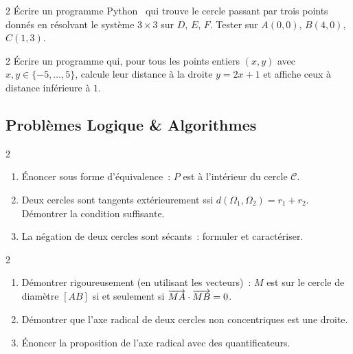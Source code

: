 \begin{bilan}
\begin{exo}{2}
\'Ecrire un programme Python \computer\ qui trouve le cercle passant par trois
points donn\'es en r\'esolvant le syst\`eme $3\times3$ sur $D$, $E$, $F$.
Tester sur $A(0,0)$, $B(4,0)$, $C(1,3)$.
\end{exo}

\begin{exo}{2}
\'Ecrire un programme qui, pour tous les points entiers $(x,y)$
avec $x,y\in\{-5,\ldots,5\}$, calcule leur distance \`a la droite $y=2x+1$
et affiche ceux \`a distance inf\'erieure \`a $1$.
\end{exo}

\subsection*{Probl\`emes Logique \& Algorithmes}

\begin{probleme}{2}
\begin{enumerate}
  \item \'Enoncer sous forme d'\'equivalence~:
        \og $P$ est \`a l'int\'erieur du cercle $\mathcal{C}$.\fg
  \item Deux cercles sont tangents ext\'erieurement ssi $d(\Omega_1,\Omega_2)=r_1+r_2$.
        D\'emontrer la condition suffisante.
  \item La n\'egation de \og deux cercles sont s\'ecants\fg~: formuler et caract\'eriser.
\end{enumerate}
\end{probleme}

\begin{probleme}{2}
\begin{enumerate}
  \item D\'emontrer rigoureusement (en utilisant les vecteurs)~:
        $M$ est sur le cercle de diam\`etre $[AB]$ si et seulement si $\overrightarrow{MA}\cdot\overrightarrow{MB}=0$.
  \item D\'emontrer que l'axe radical de deux cercles non concentriques
        est une droite.
  \item \'Enoncer la proposition de l'axe radical avec des quantificateurs.
\end{enumerate}
\end{probleme}


\end{bilan}
